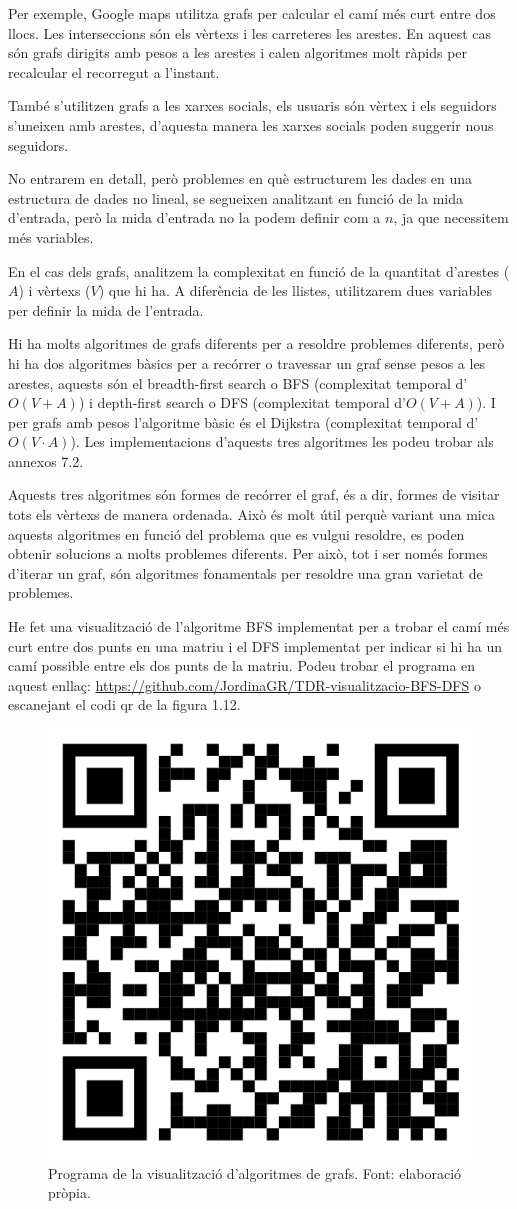 Per exemple, Google maps utilitza grafs per calcular el camí més curt entre dos llocs. Les interseccions són els vèrtexs i les carreteres les arestes. En aquest cas són grafs dirigits amb pesos a les arestes i calen algoritmes molt ràpids per recalcular el recorregut a l'instant.

També s'utilitzen grafs a les xarxes socials, els usuaris són vèrtex i els seguidors s'uneixen amb arestes, d'aquesta manera les xarxes socials poden suggerir nous seguidors.

No entrarem en detall, però problemes en què estructurem les dades en una estructura de dades no lineal, se segueixen analitzant en funció de la mida d'entrada, però la mida d'entrada no la podem definir com a $n$, ja que necessitem més variables.

En el cas dels grafs, analitzem la complexitat en funció de la quantitat d'arestes ($A$) i vèrtexs ($V$) que hi ha. A diferència de les llistes, utilitzarem dues variables per definir la mida de l'entrada.

Hi ha molts algoritmes de grafs diferents per a resoldre problemes diferents, però hi ha dos algoritmes bàsics per a recórrer o travessar un graf sense pesos a les arestes, aquests són el breadth-first search o BFS (complexitat temporal d'$O(V + A)$) i depth-first search o DFS (complexitat temporal d'$O(V + A)$). I per grafs amb pesos l'algoritme bàsic és el Dijkstra (complexitat temporal d'$O(V \cdot A)$). Les implementacions d'aquests tres algoritmes les podeu trobar als annexos 7.2.

Aquests tres algoritmes són formes de recórrer el graf, és a dir, formes de visitar tots els vèrtexs de manera ordenada. Això és molt útil perquè variant una mica aquests algoritmes en funció del problema que es vulgui resoldre, es poden obtenir solucions a molts problemes diferents. Per això, tot i ser només formes d'iterar un graf, són algoritmes fonamentals per resoldre una gran varietat de problemes.

He fet una visualització de l'algoritme BFS implementat per a trobar el camí més curt entre dos punts en una matriu i el DFS implementat per indicar si hi ha un camí possible entre els dos punts de la matriu. Podeu trobar el programa en aquest enllaç: \url{https://github.com/JordinaGR/TDR-visualitzacio-BFS-DFS} o escanejant el codi qr de la figura 1.12.
\vspace{18pt}
\begin{figure}[H]
    \centering
    \includegraphics[width=.15\textwidth]{capitols/figures/17.png}
    \caption[Programa de la visualització d'algoritmes de grafs.]{Programa de la visualització d'algoritmes de grafs. Font: elaboració pròpia.}
    \label{fig:my_label}
\end{figure}

